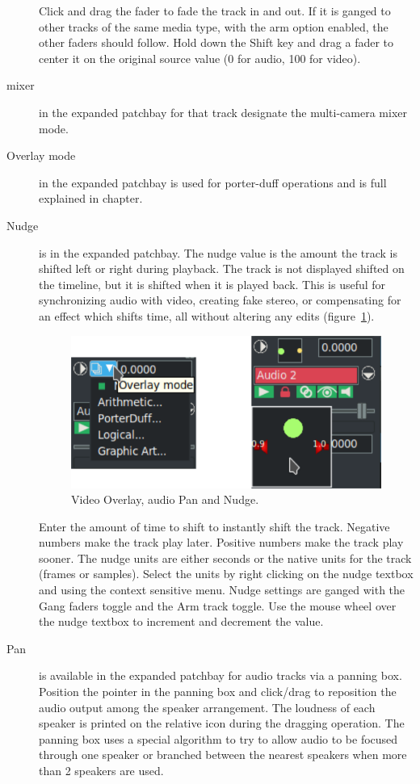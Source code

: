 \begin{description}
    Click and drag the fader to fade the track in and out.  If it is ganged to other tracks of the same media type, with the arm option enabled, the other faders should follow.  Hold down the Shift key and drag a fader to center it on the original source value (0 for audio, 100 for video).
    \item[mixer] in the expanded patchbay for that track designate the multi-camera mixer mode.
    \item[Overlay mode] in the expanded patchbay is used for porter-duff operations and is full explained in  chapter.
    \item[Nudge] is in the expanded patchbay.  The nudge value is the amount the track is shifted left or right during playback. The track is not displayed shifted on the timeline, but it is shifted when it is played back. This is useful for synchronizing audio with video, creating fake stereo, or compensating for an effect which shifts time, all without altering any edits (figure~\ref{fig:overlay}).
    
    \begin{figure}[htpb]
        \centering
        \includegraphics[width=0.7\linewidth]{images/overlay.png}
        \caption{Video Overlay, audio Pan and Nudge.}
        \label{fig:overlay}
    \end{figure}
    
    Enter the amount of time to shift to instantly shift the track. Negative numbers make the track play later. Positive numbers make the track play sooner. The nudge units are either seconds or the native units for the track (frames or samples). Select the units by right clicking on the nudge textbox and using the context sensitive menu. Nudge settings are ganged with the Gang faders toggle and the Arm track toggle. Use the mouse wheel over the nudge textbox to increment and decrement the value.
    \item[Pan] is available in the expanded patchbay for audio tracks via a panning box. Position the pointer in the panning box and click/drag to reposition the audio output among the speaker arrangement. The loudness of each speaker is printed on the relative icon during the dragging operation. The panning box uses a special algorithm to try to allow audio to be focused through one speaker or branched between the nearest speakers when more than 2 speakers are used.  
\end{description}

